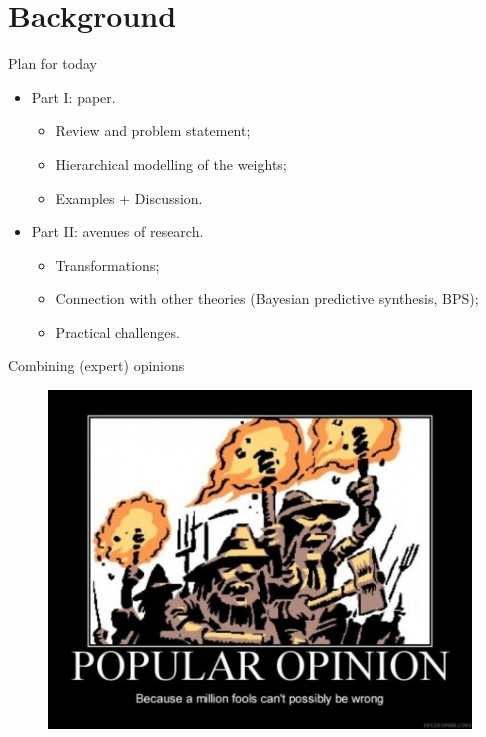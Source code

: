 \section*{Background}
\begin{frame}[t,plain]
\titlepage
\end{frame}
\begin{frame}{Plan for today}
\begin{itemize}
 \item Part I: paper.
\begin{itemize}
 \item Review and problem statement;
 \item Hierarchical modelling of the weights;
 \item Examples + Discussion.
\end{itemize}
\item Part II: avenues of research.
\begin{itemize}
 \item Transformations;
 \item Connection with other theories (Bayesian predictive synthesis, BPS);
 \item Practical challenges.
\end{itemize}
\end{itemize}
\end{frame}
\begin{frame}{Combining (expert) opinions}
\begin{figure}
 \begin{center}
  \includegraphics[scale=0.5]{../figures/Consensus.jpg}
 \end{center}
\end{figure}
\end{frame}
